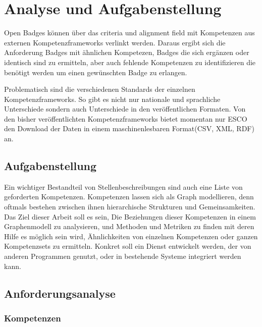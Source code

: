 \section{Analyse und Aufgabenstellung}\label{analysis}

Open Badges können über das criteria und alignment field mit Kompetenzen aus externen Kompetenzframeworks verlinkt werden. Daraus ergibt sich die Anforderung Badges mit ähnlichen Kompetezen, Badges die sich ergänzen oder identisch sind zu ermitteln, aber auch fehlende Kompetenzen zu identifizieren die benötigt werden um einen gewünschten Badge zu erlangen. \cite{OBNO3-A2}


Problematisch sind die verschiedenen Standards der einzelnen Kompetenzframeworks. So gibt es nicht nur nationale und sprachliche Unterschiede sondern auch Unterschiede in den veröffentlichen Formaten. Von den bisher veröffentlichten Kompetenzframeworks bietet momentan nur ESCO den Download der Daten in einem maschinenlesbaren Format(CSV, XML, RDF) an. 
\vspace{1em}

\subsection{Aufgabenstellung}

Ein wichtiger Bestandteil von Stellenbeschreibungen sind auch eine Liste von geforderten Kompetenzen. Kompetenzen lassen sich als Graph modellieren, denn oftmals bestehen zwischen ihnen hierarchische Strukturen und Gemeinsamkeiten. Das Ziel dieser Arbeit soll es sein, Die Beziehungen dieser Kompetenzen in einem Graphenmodell zu analysieren, und Methoden und Metriken zu finden mit deren Hilfe es möglich sein wird, Ähnlichkeiten von einzelnen Kompetenzen oder ganzen Kompetenzsets zu ermitteln. Konkret soll ein Dienst entwickelt werden, der von anderen Programmen genutzt, oder in bestehende Systeme integriert werden kann.


\subsection{Anforderungsanalyse} 

\subsubsection{Kompetenzen}

